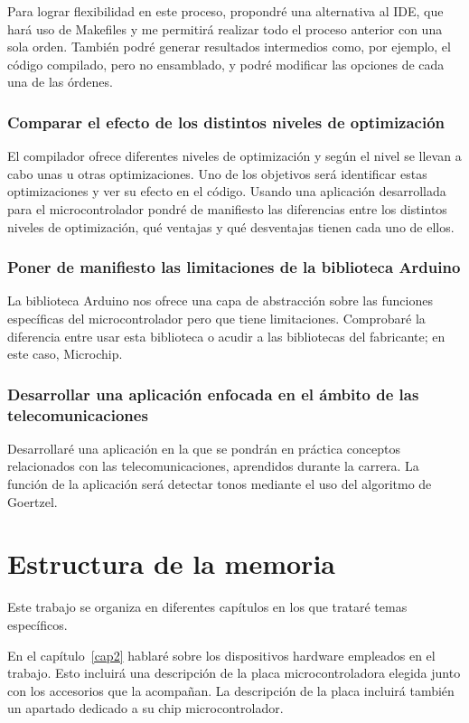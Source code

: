 Para lograr flexibilidad en este proceso, propondré una alternativa al IDE, que hará uso de Makefiles y me permitirá realizar todo el proceso anterior con una sola orden. También podré generar resultados intermedios como, por ejemplo, el código compilado, pero no ensamblado, y podré modificar las opciones de cada una de las órdenes.

\subsubsection{Comparar el efecto de los distintos niveles de optimización}
El compilador ofrece diferentes niveles de optimización y según el nivel se llevan a cabo unas u otras optimizaciones. Uno de los objetivos será identificar estas optimizaciones y ver su efecto en el código. Usando una aplicación desarrollada para el microcontrolador pondré de manifiesto las diferencias entre los distintos niveles de optimización, qué ventajas y qué desventajas tienen cada uno de ellos.

\subsubsection{Poner de manifiesto las limitaciones de la biblioteca Arduino}
La biblioteca Arduino nos ofrece una capa de abstracción sobre las funciones específicas del microcontrolador pero que tiene limitaciones. Comprobaré la diferencia entre usar esta biblioteca o acudir a las bibliotecas del fabricante; en este caso, Microchip.

\subsubsection{Desarrollar una aplicación enfocada en el ámbito de las telecomunicaciones}
Desarrollaré una aplicación en la que se pondrán en práctica conceptos relacionados con las telecomunicaciones, aprendidos durante la carrera. La función de la aplicación será detectar tonos mediante el uso del algoritmo de Goertzel.


\section{Estructura de la memoria}
Este trabajo se organiza en diferentes capítulos en los que trataré temas específicos.

En el capítulo~\ref{cap2} hablaré sobre los dispositivos hardware empleados en el trabajo. Esto incluirá una descripción de la placa microcontroladora elegida junto con los accesorios que la acompañan. La descripción de la placa incluirá también un apartado dedicado a su chip microcontrolador.


